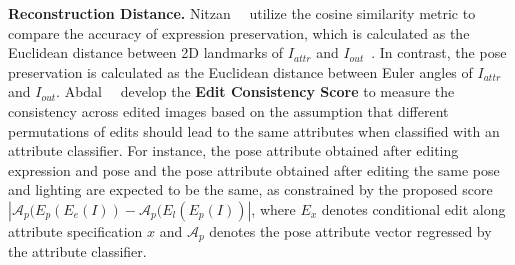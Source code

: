 \vspace{1mm}
\noindent\textbf{Reconstruction Distance.}
Nitzan~\etal~\cite{nitzan2020harness} utilize the cosine similarity metric to compare the accuracy of expression preservation, which is calculated as the Euclidean distance between 2D landmarks of $I_{attr}$ and $I_{out}$~\cite{dlib2009}. In contrast, the pose preservation is calculated as the Euclidean distance between Euler angles of $I_{attr}$ and $I_{out}$.
Abdal~\etal~\cite{abdal2020styleflow} develop the \textbf{Edit Consistency Score} to measure the consistency across edited images based on the assumption that different permutations of edits should lead to the same attributes when classified with an attribute classifier.
For instance, the pose attribute obtained after editing expression and pose and the pose attribute obtained after editing the same pose and lighting are expected to be the same, as constrained by the proposed score $|\mathcal{A}_p(E_p(E_e(I))-\mathcal{A}_p(E_l(E_p(I))|$, where $E_x$ denotes conditional edit along attribute specification $x$ and $\mathcal{A}_p$ denotes the pose attribute vector regressed by the attribute classifier.